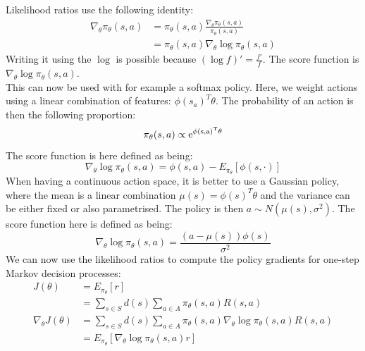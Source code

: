 \documentclass[a4paper]{article}
\begin{document}
Likelihood ratios use the following identity:
\begin{align}
\nabla_{\theta}\pi_{\theta}(s,a) &= \pi_{\theta}(s,a) \frac{\nabla_{\theta}\pi_{\theta}(s,a)}{\pi_{\theta}(s,a)}\\
&= \pi_{\theta}(s,a) \nabla_{\theta} \log \pi_{\theta}(s,a)
\end{align}
Writing it using the $\log$ is possible because $(\log f)' = \frac{f'}{f}$. The score function is $\nabla_{\theta} \log \pi_{\theta}(s,a)$.\\
This can now be used with for example a softmax policy. Here, we weight actions using a linear combination of features: $\phi(s_a)^T \theta$. The probability of an action is then the following proportion:
\begin{equation}
\pi_{\theta}(s,a) \propto \rm{e}^{\phi(s,a)^T \theta}
\end{equation}
The score function is here defined as being:
\begin{equation}
\nabla_{\theta} \log \pi_{\theta}(s,a) = \phi(s,a) - E_{\pi_{\theta}}[\phi(s,\cdot)]
\end{equation}
When having a continuous action space, it is better to use a Gaussian policy, where the mean is a linear combination $\mu(s) = \phi(s)^T \theta$ and the variance can be either fixed or also parametrised. The policy is then $a \sim N(\mu(s), \sigma^2)$. The score function here is defined as being:
\begin{equation}
\nabla_{\theta} \log \pi_{\theta}(s,a) = \frac{(a-\mu(s))\phi(s)}{\sigma^2}
\end{equation}
We can now use the likelihood ratios to compute the policy gradients for one-step Markov decision processes:
\begin{align}
J(\theta) &= E_{\pi_{\theta}}[r]\\
&= \sum_{s \in S} d(s) \sum_{a \in A} \pi_{\theta}(s,a) R(s,a)\\
\nabla_{\theta} J(\theta) &= \sum_{s \in S} d(s) \sum_{a \in A} \pi_{\theta}(s,a) \nabla_{\theta} \log \pi_{\theta}(s,a) R(s,a)\\
&= E_{\pi_{\theta}} [\nabla_{\theta} \log \pi_{\theta}(s,a)r]
\end{align}
\end{document}
